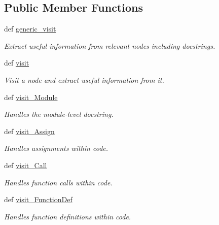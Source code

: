 \subsection*{Public Member Functions}
\begin{DoxyCompactItemize}
\item 
def \hyperlink{classdoxypypy_1_1doxypypy_1_1_ast_walker_acfee0cecf002eda81ab938aa0c7aa95a}{generic\-\_\-visit}
\begin{DoxyCompactList}\small\item\em Extract useful information from relevant nodes including docstrings. \end{DoxyCompactList}\item 
def \hyperlink{classdoxypypy_1_1doxypypy_1_1_ast_walker_af651921b10618f1d86ef7d331b8fcec3}{visit}
\begin{DoxyCompactList}\small\item\em Visit a node and extract useful information from it. \end{DoxyCompactList}\item 
def \hyperlink{classdoxypypy_1_1doxypypy_1_1_ast_walker_ad1abc2acf1f4453ff8c1e840079bc5c1}{visit\-\_\-\-Module}
\begin{DoxyCompactList}\small\item\em Handles the module-\/level docstring. \end{DoxyCompactList}\item 
def \hyperlink{classdoxypypy_1_1doxypypy_1_1_ast_walker_a59745774cc4349d8020d6be530b4a0eb}{visit\-\_\-\-Assign}
\begin{DoxyCompactList}\small\item\em Handles assignments within code. \end{DoxyCompactList}\item 
def \hyperlink{classdoxypypy_1_1doxypypy_1_1_ast_walker_af12607dc155772e5befd9774ea4194e2}{visit\-\_\-\-Call}
\begin{DoxyCompactList}\small\item\em Handles function calls within code. \end{DoxyCompactList}\item 
def \hyperlink{classdoxypypy_1_1doxypypy_1_1_ast_walker_ac692e0258538d9465051679eec47ce9a}{visit\-\_\-\-Function\-Def}
\begin{DoxyCompactList}\small\item\em Handles function definitions within code. \end{DoxyCompactList}\item 

\end{DoxyCompactItemize}
